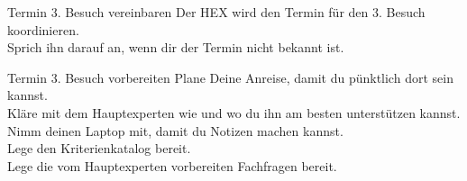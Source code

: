 \begin{taskitem}{Termin 3. Besuch vereinbaren}
  Der HEX wird den Termin für den 3. Besuch koordinieren.\\
  Sprich ihn darauf an, wenn dir der Termin nicht bekannt ist.\\
\end{taskitem}
\newpage
\begin{taskitem}{Termin 3. Besuch vorbereiten}
  Plane Deine Anreise, damit du pünktlich dort sein kannst.\\
  Kläre mit dem Hauptexperten wie und wo du ihn am besten unterstützen kannst.\\
  Nimm deinen Laptop mit, damit du Notizen machen kannst.\\
  Lege den Kriterienkatalog bereit.\\
  Lege die vom Hauptexperten vorbereiten Fachfragen bereit.
\end{taskitem}
